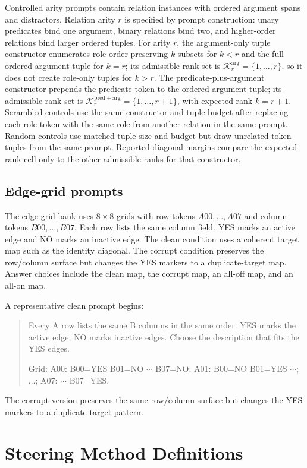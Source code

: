 \documentclass[11pt]{article}
\begin{document}
Controlled arity prompts contain relation instances with ordered argument spans and distractors. Relation arity $r$ is specified by prompt construction: unary predicates bind one argument, binary relations bind two, and higher-order relations bind larger ordered tuples. For arity $r$, the argument-only tuple constructor enumerates role-order-preserving $k$-subsets for $k<r$ and the full ordered argument tuple for $k=r$; its admissible rank set is $\mathcal{K}^{\mathrm{arg}}_r=\{1,\ldots,r\}$, so it does not create role-only tuples for $k>r$. The predicate-plus-argument constructor prepends the predicate token to the ordered argument tuple; its admissible rank set is $\mathcal{K}^{\mathrm{pred+arg}}_r=\{1,\ldots,r+1\}$, with expected rank $k=r+1$. Scrambled controls use the same constructor and tuple budget after replacing each role token with the same role from another relation in the same prompt. Random controls use matched tuple size and budget but draw unrelated token tuples from the same prompt. Reported diagonal margins compare the expected-rank cell only to the other admissible ranks for that constructor.

\subsection{Edge-grid prompts}

The edge-grid bank uses $8 \times 8$ grids with row tokens $A00,\ldots,A07$ and column tokens $B00,\ldots,B07$. Each row lists the same column field. YES marks an active edge and NO marks an inactive edge. The clean condition uses a coherent target map such as the identity diagonal. The corrupt condition preserves the row/column surface but changes the YES markers to a duplicate-target map. Answer choices include the clean map, the corrupt map, an all-off map, and an all-on map.

A representative clean prompt begins:
\begin{quote}\small
Every A row lists the same B columns in the same order. YES marks the active edge; NO marks inactive edges. Choose the description that fits the YES edges.

Grid: A00: B00=YES B01=NO $\cdots$ B07=NO; A01: B00=NO B01=YES $\cdots$; $\ldots$; A07: $\cdots$ B07=YES.
\end{quote}
The corrupt version preserves the same row/column surface but changes the YES markers to a duplicate-target pattern.

\section{Steering Method Definitions}
\end{document}
